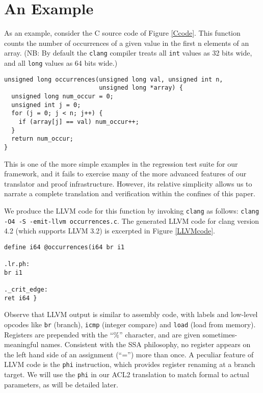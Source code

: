 \documentclass{eptcs}
\begin{document}
\section{An Example}\label{example}

As an example, consider the C source code of Figure \ref{Ccode}.
This function counts the number of occurrences of a given value in the
first n elements of an array.  (NB: By default the \texttt{clang} compiler
treats all \texttt{int} values as 32 bits wide, and all \texttt{long}
values as 64 bits wide.)

\begin{figure*}
\begin{verbatim}
unsigned long occurrences(unsigned long val, unsigned int n, 
                          unsigned long *array) {
  unsigned long num_occur = 0;
  unsigned int j = 0;
  for (j = 0; j < n; j++) {
    if (array[j] == val) num_occur++;
  }
  return num_occur;
}
\end{verbatim}
\hrulefill
\caption{Example C code to count occurrences of an input value in an array.}
\label{Ccode}
\end{figure*}

This is one of the more simple examples in the regression test suite
for our framework, and it fails to exercise many of the more advanced 
features of our translator and proof infrastructure.  However, its relative simplicity
allows us to narrate a complete translation and verification within 
the confines of this paper.

We produce the LLVM code for this function by invoking \texttt{clang}
as follows: \texttt{clang -O4 -S -emit-llvm occurrences.c}.  The
generated LLVM code for clang version 4.2 (which supports LLVM 3.2) is
excerpted in Figure \ref{LLVMcode}.

\begin{figure*}
\begin{verbatim}
define i64 @occurrences(i64 br i1 

.lr.ph:
br i1 

._crit_edge:
ret i64 }
\end{verbatim}
\hrulefill
\caption{LLVM code for the occurrences example.}
\label{LLVMcode}
\end{figure*}


Observe that LLVM output is similar to assembly code, with labels and
low-level opcodes like \texttt{br} (branch), \texttt{icmp} (integer
compare) and \texttt{load} (load from memory).  Registers are
prepended with the ``\%'' character, and are given
sometimes-meaningful names.  Consistent with the SSA philosophy, no
register appears on the left hand side of an assignment (``='') more
than once.  A peculiar feature of LLVM code is the \texttt{phi}
instruction, which provides register renaming at a branch target.  We
will use the \texttt{phi} in our ACL2 translation to match formal to
actual parameters, as will be detailed later.
\end{document}
